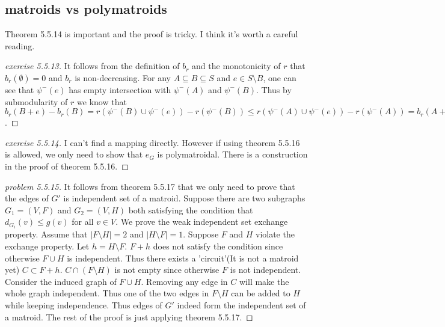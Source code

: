\subsection{matroids vs polymatroids}
Theorem 5.5.14 is important and the proof is tricky. I think it's worth a careful reading.
\begin{proof}[exercise 5.5.13]
    It follows from the definition of $b_r$ and the monotonicity of $r$ that $b_r(\emptyset)=0$ and $b_r$ is non-decreasing. For any $A\subseteq B\subseteq S$ and $e\in S\setminus B$, one can see that $\psi^-(e)$ has empty intersection with $\psi^-(A)$ and $\psi^-(B)$. Thus by submodularity of $r$ we know that $b_r(B+e)-b_r(B)=r(\psi^-(B)\cup \psi^-(e))-r(\psi^-(B))\leq r(\psi^-(A)\cup \psi^-(e))-r(\psi^-(A))=b_r(A+e)-b_r(A)$.
\end{proof}

\begin{proof}[exercise 5.5.14]
    I can't find a mapping directly. However if using theorem 5.5.16 is allowed, we only need to show that $e_G$ is polymatroidal. There is a construction in the proof of theorem 5.5.16.
\end{proof}

\begin{proof}[problem 5.5.15]
    It follows from theorem 5.5.17 that we only need to prove that the edges of $G'$ is independent set of a matroid. Suppose there are two subgraphs $G_1=(V,F)$ and $G_2=(V,H)$ both satisfying the condition that $d_{G_i}(v)\leq g(v)$ for all $v\in V$. We prove the weak independent set exchange property. Assume that $|F\setminus H|=2$ and $|H\setminus F|=1$. Suppose $F$ and $H$ violate the exchange property. Let $h=H\setminus F$. $F+h$ does not satisfy the condition since otherwise $F\cup H$ is independent. Thus there exists a 'circuit'(It is not a matroid yet) $C\subset F+h$. $C\cap (F\setminus H)$ is not empty since otherwise $F$ is not independent. Consider the induced graph of $F\cup H$. Removing any edge in $C$ will make the whole graph independent. Thus one of the two edges in $F\setminus H$ can be added to $H$ while keeping independence. Thus edges of $G'$ indeed form the independent set of a matroid. The rest of the proof is just applying theorem 5.5.17.
\end{proof}